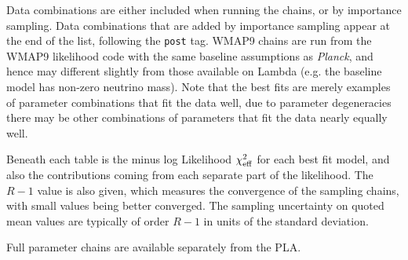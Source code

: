 Data combinations are either included when running the chains, or by importance sampling. Data combinations that are added by importance sampling appear
at the end of the list, following the {\tt post{\textunderscore}} tag. WMAP9 chains are run from the WMAP9 likelihood code with the same baseline assumptions as \textit{Planck}, and hence
may different slightly from those available on Lambda (e.g. the baseline model has non-zero neutrino mass). Note that the best fits are merely examples of parameter combinations that fit the data well, due to parameter degeneracies there may be other combinations of parameters that fit the data nearly equally well.

Beneath each table is the minus log Likelihood $\chi^2_{\rm eff}$ for each best fit model, and also the contributions coming from each separate part of the likelihood. The $R-1$ value is also given, which measures the convergence of the sampling chains, with small values being better converged. The sampling uncertainty on quoted mean values are typically of order $R-1$ in units of the standard deviation.

Full parameter chains are available separately from the PLA.

\newpage
